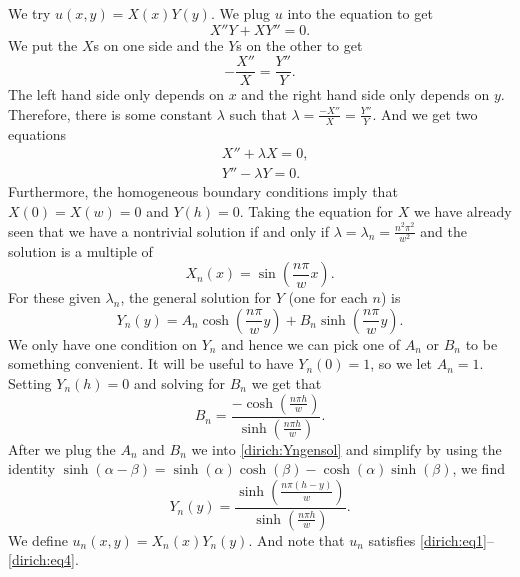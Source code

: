 \documentclass[12pt]{book}
\begin{document}
We try $u(x,y) = X(x)Y(y)$.  We plug $u$ into the equation to get
\begin{equation*}
X''Y + XY'' = 0 .
\end{equation*}
We put the $X$s on one side and the $Y$s on the other to get
\begin{equation*}
- \frac{X''}{X} = \frac{Y''}{Y} .
\end{equation*}
The left hand side only depends on $x$ and the right hand side only depends
on $y$.  Therefore, there is some constant $\lambda$ such that
$\lambda = \frac{-X''}{X} = \frac{Y''}{Y}$.
And we get two equations
\begin{align*}
& X'' + \lambda X = 0 , \\
& Y'' - \lambda Y = 0 .
\end{align*}
Furthermore, the homogeneous boundary conditions imply that
$X(0) = X(w) = 0$ and $Y(h) = 0$.  Taking the equation for $X$
we have already seen that we have a nontrivial solution if and only if
$\lambda = \lambda_n = \frac{n^2 \pi^2}{w^2}$ and the solution is
a multiple of
\begin{equation*}
X_n(x) = \sin \left( \frac{n \pi}{w} x \right) .
\end{equation*}
For these given $\lambda_n$,
the general solution for $Y$ (one for each $n$) is
\begin{equation} \label{dirich:Yngensol}
Y_n(y) = A_n \cosh \left( \frac{n \pi}{w} y \right)
+ B_n \sinh \left( \frac{n \pi}{w} y \right) .
\end{equation}
We only have one condition on $Y_n$ and hence we can pick one of $A_n$
or $B_n$
to be something convenient.
It will be useful to have $Y_n(0) = 1$, so we let $A_n=1$.
Setting $Y_n(h) = 0$ and solving for $B_n$ we get that
\begin{equation*}
B_n = \frac{- \cosh \left( \frac{n \pi h }{w} \right)}%
{\sinh \left( \frac{n \pi h }{w} \right)} .
\end{equation*}
After we plug the $A_n$ and $B_n$ we
into \eqref{dirich:Yngensol} and simplify by using
the identity $\sinh(\alpha-\beta) =
\sinh(\alpha) \cosh(\beta) -
\cosh(\alpha) \sinh(\beta)$, we find
\begin{equation*}
Y_n(y) =
\frac{\sinh \left( \frac{n \pi (h-y) }{w} \right)}%
{\sinh \left( \frac{n \pi h }{w} \right)} .
\end{equation*}
We define $u_n(x,y) = X_n(x)Y_n(y)$.
And note that $u_n$
satisfies \eqref{dirich:eq1}--\eqref{dirich:eq4}.
\end{document}
